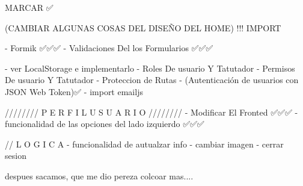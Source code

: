 
MARCAR ✅

(CAMBIAR ALGUNAS COSAS DEL DISEÑO DEL HOME) !!! IMPORT 

    - Formik ✅✅✅
    - Validaciones Del los Formularios ✅✅✅

    - ver LocalStorage e implementarlo
    - Roles De usuario Y Tatutador 
    - Permisos De usuario Y Tatutador
    - Proteccion de Rutas
    - (Autenticación de usuarios con JSON Web Token)✅
    - import emailjs 



////////   P E R F I L   U S U A R I O   ////////  
    - Modificar El Fronted ✅✅✅
    - funcionalidad de las opciones del lado izquierdo ✅✅✅

    // L O G I C A
    - funcionalidad de autualzar info 
    - cambiar imagen
    - cerrar sesion 

despues sacamos, que me dio pereza colcoar mas....


